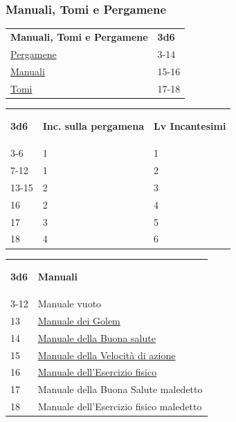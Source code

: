 \begin{multicols}{2}
{\subsubsection{Manuali, Tomi e Pergamene}\hypertarget{manualitomi}{}\label{manualitomi}

{\small\begin{tabularx}{0.45\textwidth}{lX}
\textbf{Manuali, Tomi e Pergamene}&\textbf{3d6}\\
\hyperlink{manualitomi}{Pergamene} &3-14\\
\hyperlink{manualitomi}{Manuali} &15-16\\
\hyperlink{manualitomi}{Tomi} &17-18
\end{tabularx}}

\medskip

{\small\begin{tabularx}{0.45\textwidth}{lX|l}\hypertarget{CPergamene}{}\label{CPergamene}
\textbf{3d6} & \textbf{Inc. sulla pergamena}&\textbf{Lv Incantesimi}\\
3-6& 1&1\\
7-12 & 1&2\\
13-15& 2&3\\
16& 2&4\\
17& 3&5\\
18& 4&6
\end{tabularx}}

\medskip

\begin{tabularx}{0.45\textwidth}{lX}\hypertarget{Manuali}{}
\textbf{3d6} & \textbf{Manuali}\\
3-12 & Manuale vuoto\\
13 & \hyperlink{ManualedeiGolem}{Manuale dei Golem}\\
14 & \hyperlink{ManualedellaBuonasalute}{Manuale della Buona salute}\\
15 & \hyperlink{ManualedellaVelocitàdiazione}{Manuale della Velocità di azione}\\
16 & \hyperlink{Manualedell'Eserciziofisico}{Manuale dell'Esercizio fisico}\\
17 & Manuale della Buona Salute maledetto\\
18 & Manuale dell'Esercizio fisico maledetto
\end{tabularx}

\medskip

}
\end{multicols}
